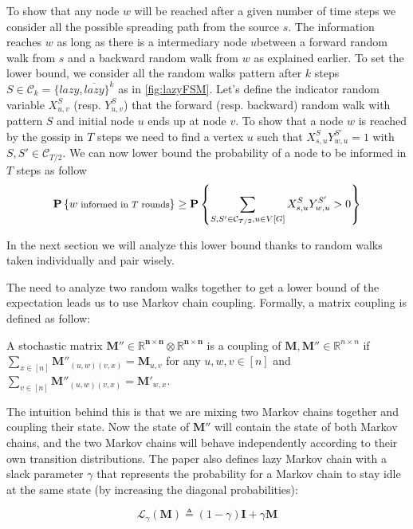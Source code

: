 \documentclass[10pt,journal,a4paper]{IEEEtran}
\begin{document}
To show that any node $w$ will be reached after a given number of time steps we consider all the possible spreading path from the source $s$. The information reaches $w$ as long as there is a intermediary node $u$between a forward random walk from $s$ and a backward random walk from $w$ as explained earlier. To set the lower bound, we consider all the random walks pattern after $k$ steps $S \in \mathcal C_k = \{ lazy, \overline{lazy} \}^k$ as in \cref{fig:lazyFSM}. Let's define the indicator random variable $X_{u,v}^S$ (resp. $Y_{u,v}^S$) that the forward (resp. backward) random walk with pattern $S$ and initial node $u$ ends up at node $v$. To show that a node $w$ is reached by the gossip in $T$ steps we need to find a vertex $u$ such that $X_{s,u}^{S}Y_{w,u}^{S'} = 1$ with $S, S' \in \mathcal C_{T/2}$. We can now lower bound the probability of a node to be informed in $T$ steps as follow
\begin{align*}
  \scriptsize
  \P{w \text{ informed in $T$ rounds}} \geq \P{\sum_{S,S'\in \mathcal C_{T/2}, u\in V[G]} X_{s,u}^S Y_{w,u}^{S'} > 0}
\end{align*}

In the next section we will analyze this lower bound thanks to random walks taken individually and pair wisely.

The need to analyze two random walks together to get a lower bound of the expectation leads us to use Markov chain coupling. Formally, a matrix coupling is defined as follow:

\begin{definition}
  A stochastic matrix $\mathbf{M'' \in \mathbb{R}^{n\times n} \otimes \mathbb{R}^{n\times n}}$ is a coupling of $\mathbf{M,M''} \in \mathbb{R}^{n\times n}$ if $\sum_{x\in[n]} \mathbf{M''}_{(u,w)(v,x)} = \mathbf{M}_{u,v}$ for any $u,w,v \in [n]$ and $\sum_{v\in[n]} \mathbf{M''}_{(u,w)(v,x)} = \mathbf{M'}_{w,x}$.
\end{definition}

The intuition behind this is that we are mixing two Markov chains together and coupling their state. Now the state of $\mathbf{M''}$ will contain the state of both Markov chains, and the two Markov chains will behave independently according to their own transition distributions. The paper \cite{guosun} also defines lazy Markov chain with a slack parameter $\gamma$ that represents the probability for a Markov chain to stay idle at the same state (by increasing the diagonal probabilities):

\[
  \mathcal L _ \gamma (\mathbf{M}) \triangleq (1-\gamma) \mathbf{I} + \gamma \mathbf{M}
\]
\end{document}
